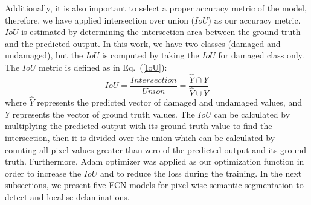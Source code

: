 Additionally, it is also important to select a proper accuracy metric of the model, therefore, we have applied intersection over union (\(IoU\)) as our accuracy metric. 
\(IoU\) is estimated by determining the intersection area between the ground truth and the predicted output.
In this work, we have two classes (damaged and undamaged), but the \(IoU\) is computed by taking the \(IoU\) for damaged class only.
The \(IoU\) metric is defined as in Eq.~(\ref{IoU}):
\begin{equation}
IoU = \frac{Intersection}{Union} = \frac{\hat{Y} \cap Y}{\hat{Y} \cup Y} 
\label{IoU}
\end{equation}
where \(\hat{Y}\) represents the predicted vector of damaged and undamaged values, and \(Y\) represents the vector of ground truth values.
The \(IoU\) can be calculated by multiplying the predicted output with its ground truth value to find the intersection, then it is divided over the union which can be calculated by counting all pixel values greater than zero of the predicted output and its ground truth.
Furthermore, Adam optimizer was applied as our optimization function in order to increase the \(IoU\) and to reduce the loss during the training.
In the next subsections, we present five FCN models for pixel-wise semantic segmentation to detect and localise delaminations.